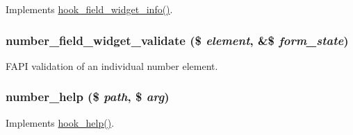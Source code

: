 \label{number_8module_a799dffc561bbf06c81daff818fcf1b2b}
Implements \hyperlink{group__field__widget_gac53aa6c2a4ac1215660d25b5d7f20792}{hook\_\-field\_\-widget\_\-info()}. \hypertarget{number_8module_a5e6fcb69b6cf24878a912017340be3dd}{
\subsubsection[{number\_\-field\_\-widget\_\-validate}]{\setlength{\rightskip}{0pt plus 5cm}number\_\-field\_\-widget\_\-validate (\$ {\em element}, \/  \&\$ {\em form\_\-state})}}
\label{number_8module_a5e6fcb69b6cf24878a912017340be3dd}
FAPI validation of an individual number element. \hypertarget{number_8module_abd9b7b4ee0cd5563585099722a3a625b}{
\subsubsection[{number\_\-help}]{\setlength{\rightskip}{0pt plus 5cm}number\_\-help (\$ {\em path}, \/  \$ {\em arg})}}
\label{number_8module_abd9b7b4ee0cd5563585099722a3a625b}
Implements \hyperlink{group__hooks_ga5589c2714a782738e8851c4c90231f0e}{hook\_\-help()}. 